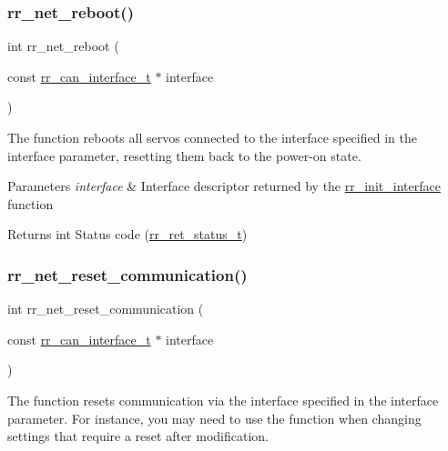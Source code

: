 \subsubsection{\texorpdfstring{rr\+\_\+net\+\_\+reboot()}{rr\_net\_reboot()}}
{\footnotesize\ttfamily int rr\+\_\+net\+\_\+reboot (\begin{DoxyParamCaption}\item[{const \hyperlink{structrr__can__interface__t}{rr\+\_\+can\+\_\+interface\+\_\+t} $\ast$}]{interface }\end{DoxyParamCaption})}



The function reboots all servos connected to the interface specified in the \textquotesingle{}interface\textquotesingle{} parameter, resetting them back to the power-\/on state. 


\begin{DoxyParams}{Parameters}
{\em interface} & Interface descriptor returned by the \hyperlink{group___common_ga472a4890dcc7d7a13123c56a06946d91}{rr\+\_\+init\+\_\+interface} function \\
\hline
\end{DoxyParams}
\begin{DoxyReturn}{Returns}
int Status code (\hyperlink{api_8h_a92d5be5038abcf89837faf85a08debdc}{rr\+\_\+ret\+\_\+status\+\_\+t}) 
\end{DoxyReturn}
\mbox{\label{group___system__control_ga7591c01ec4b20388fad7effe3266e3b1}} 
\subsubsection{\texorpdfstring{rr\+\_\+net\+\_\+reset\+\_\+communication()}{rr\_net\_reset\_communication()}}
{\footnotesize\ttfamily int rr\+\_\+net\+\_\+reset\+\_\+communication (\begin{DoxyParamCaption}\item[{const \hyperlink{structrr__can__interface__t}{rr\+\_\+can\+\_\+interface\+\_\+t} $\ast$}]{interface }\end{DoxyParamCaption})}



The function resets communication via the interface specified in the \textquotesingle{}interface\textquotesingle{} parameter. For instance, you may need to use the function when changing settings that require a reset after modification. 


